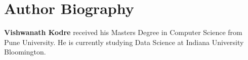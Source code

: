 \documentclass[9pt,twocolumn,twoside]{../../styles/osajnl}
\begin{document}

 
\section*{Author Biography}
\begingroup
\setlength\intextsep{0pt}
\begin{minipage}[t][3.2cm][t]{1.0\columnwidth} %
  \noindent
  {\bfseries Vishwanath Kodre} received his Masters Degree in Computer Science from Pune University.  He is currently studying Data Science at Indiana University Bloomington.
\end{minipage}
\endgroup
\end{document}
